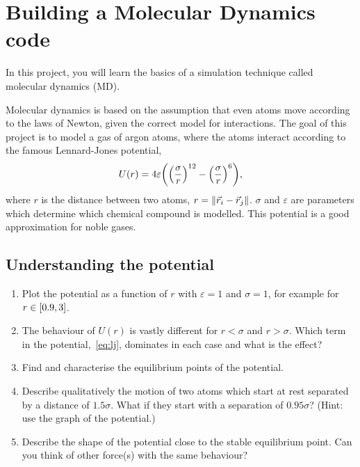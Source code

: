 \documentclass[11pt,english,a4paper]{report}
\begin{document}
\section{Building a Molecular Dynamics code}

In this project, you will learn the basics of a simulation technique called molecular dynamics (MD). 

Molecular dynamics is based on the assumption that even atoms move according to the laws of Newton, given the correct model for interactions. The goal of this project is to model a gas of  argon atoms, where the atoms interact according to the famous Lennard-Jones potential,
\begin{equation}
    U(r) = 4\varepsilon\qty(\qty(\frac{\sigma}{r})^{12} - \qty(\frac{\sigma}{r})^6), \label{eq:lj}
\end{equation}
where \(r\) is the distance between two atoms, \(r=\norm{\vec{r}_i-\vec{r}_j}\). \(\sigma\) and \(\varepsilon\) are parameters which determine which chemical compound is modelled. This potential is a good approximation for noble gases.

\subsection{Understanding the potential}\label{subsec:understanding}
\begin{enumerate}[label=\roman*.]
    \item Plot the potential as a function of \(r\) with \(\varepsilon=1\) and \(\sigma=1\), for example for \(r \in \qty[0.9,3]\).
    \item The behaviour of \(U(r)\) is vastly different for \(r < \sigma\) and \(r > \sigma\). Which term in the potential,~\vref{eq:lj}, dominates in each case and what is the effect?
    \item Find and characterise the equilibrium points of the potential.
    \item Describe qualitatively the motion of two atoms which start at rest separated by a distance of \(\num{1.5}\sigma\). What if they start with a separation of \(\num{0.95}\sigma\)?  (Hint: use the graph of the potential.)
    \item Describe the shape of the potential close to the stable equilibrium point. Can you think of other force(s) with the same behaviour?
\end{enumerate}
\end{document}
